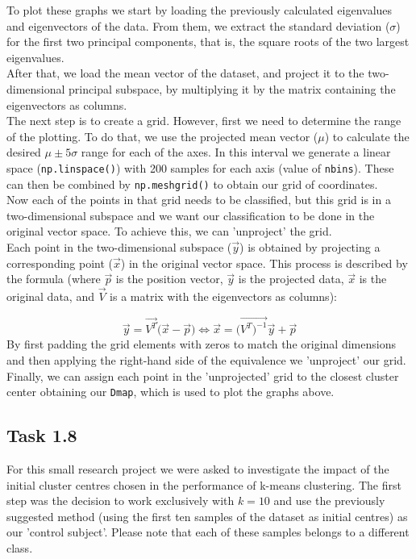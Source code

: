 \documentclass{article}
\begin{document}
To plot these graphs we start by loading the previously calculated eigenvalues and eigenvectors of the data. From them, we extract the standard deviation ($\sigma$) for the first two principal components, that is, the square roots of the two largest eigenvalues. \\
After that, we load the mean vector of the dataset, and project it to the two-dimensional principal subspace, by multiplying it by the matrix containing the eigenvectors as columns. \\
The next step is to create a grid. However, first we need to determine the range of the plotting. To do that, we use the projected mean vector ($\mu$) to calculate the desired $\mu \pm 5\sigma$ range for each of the axes. In this interval we generate a linear space (\texttt{np.linspace()}) with 200 samples for each axis (value of \texttt{nbins}). These can then be combined by \texttt{np.meshgrid()} to obtain our grid of coordinates. \\
Now each of the points in that grid needs to be classified, but this grid is in a two-dimensional subspace and we want our classification to be done in the original vector space. To achieve this, we can 'unproject' the grid. \\
Each point in the two-dimensional subspace ($\vec{y}$) is obtained by projecting a corresponding point ($\vec{x}$) in the original vector space. This process is described by the formula (where $\vec{p}$ is the position vector, $\vec{y}$ is the projected data, $\vec{x}$ is the original data, and $\vec{V}$ is a matrix with the eigenvectors as columns):

\[
\vec{y} = \vec{V^T} \dot (\vec{x} - \vec{p}) \Leftrightarrow
\vec{x} = (\vec{V^T)^{-1}} \vec{y} + \vec{p}
\]
By first padding the grid elements with zeros to match the original dimensions and then applying the right-hand side of the equivalence we 'unproject' our grid. Finally, we can assign each point in the 'unprojected' grid to the closest cluster center obtaining our \texttt{Dmap}, which is used to plot the graphs above.

\newpage
\subsection*{Task 1.8}

For this small research project we were asked to investigate the impact of the initial cluster centres chosen in the performance of k-means clustering. The first step was the decision to work exclusively with $k = 10$ and use the previously suggested method (using the first ten samples of the dataset as initial centres) as our 'control subject'. Please note that each of these samples belongs to a different class.
\end{document}
